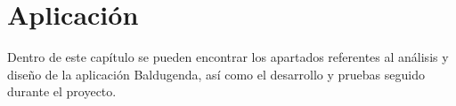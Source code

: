 \chapter{Aplicación}
\label{ch:aplicación}


Dentro de este capítulo se pueden encontrar los apartados referentes al análisis y diseño de la aplicación Baldugenda, así como el desarrollo y pruebas seguido durante el proyecto.


\newpage
























